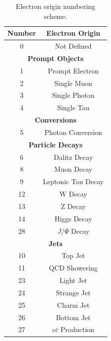\begin{table}[htb!]
    \centering
    \begin{tabular}{|c|c|}
    \hline
    \textbf{Number} & \textbf{Electron Origin}\\
    \hline
    0 & Not Defined\\
    \hline
    \multicolumn{2}{|c|}{\textbf{Prompt Objects}}\\
    \hline
    1 & Prompt Electron \\
    2 & Single Muon \\
    3 & Single Photon \\
    4 & Single Tau \\
    \hline
    \multicolumn{2}{|c|}{\textbf{Conversions}}\\
    \hline
    5 & Photon Conversion \\
    \hline
    \multicolumn{2}{|c|}{\textbf{Particle Decays}}\\
    \hline
    6 & Dalitz Decay\\
    8 & Muon Decay\\
    9 & Leptonic Tau Decay\\
    12 & W Decay\\
    13 & Z Decay\\
    14 & Higgs Decay \\
    28 & $J/\Psi$ Decay\\
    \hline
    \multicolumn{2}{|c|}{\textbf{Jets}}\\
    \hline
    10 & Top Jet\\
    11 & QCD Showering\\
    23 & Light Jet\\
    24 & Strange Jet\\
    25 & Charm Jet\\
    26 & Bottom Jet\\
    27 & $c\bar{c}$ Production\\
    \hline
    \end{tabular}
    \caption{Electron origin numbering scheme.}
    \label{tab:elec_origin}
\end{table}

